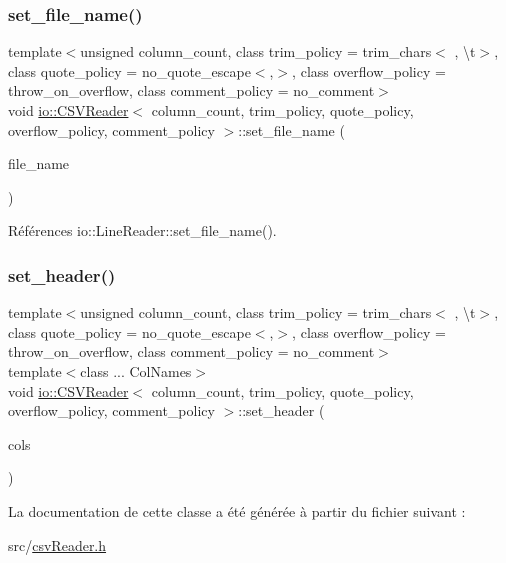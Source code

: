 \subsubsection{\texorpdfstring{set\+\_\+file\+\_\+name()}{set\_file\_name()}\hspace{0.1cm}{\footnotesize\ttfamily [2/2]}}
{\footnotesize\ttfamily template$<$unsigned column\+\_\+count, class trim\+\_\+policy  = trim\+\_\+chars$<$\textquotesingle{} \textquotesingle{}, \textquotesingle{}\textbackslash{}t\textquotesingle{}$>$, class quote\+\_\+policy  = no\+\_\+quote\+\_\+escape$<$\textquotesingle{},\textquotesingle{}$>$, class overflow\+\_\+policy  = throw\+\_\+on\+\_\+overflow, class comment\+\_\+policy  = no\+\_\+comment$>$ \\
void \hyperlink{classio_1_1CSVReader}{io\+::\+C\+S\+V\+Reader}$<$ column\+\_\+count, trim\+\_\+policy, quote\+\_\+policy, overflow\+\_\+policy, comment\+\_\+policy $>$\+::set\+\_\+file\+\_\+name (\begin{DoxyParamCaption}\item[{const char $\ast$}]{file\+\_\+name }\end{DoxyParamCaption})\hspace{0.3cm}{\ttfamily [inline]}}



Références io\+::\+Line\+Reader\+::set\+\_\+file\+\_\+name().

\mbox{\label{classio_1_1CSVReader_ab68eedff1bd59a49fa4ddb160dff94e0}} 
\subsubsection{\texorpdfstring{set\+\_\+header()}{set\_header()}}
{\footnotesize\ttfamily template$<$unsigned column\+\_\+count, class trim\+\_\+policy  = trim\+\_\+chars$<$\textquotesingle{} \textquotesingle{}, \textquotesingle{}\textbackslash{}t\textquotesingle{}$>$, class quote\+\_\+policy  = no\+\_\+quote\+\_\+escape$<$\textquotesingle{},\textquotesingle{}$>$, class overflow\+\_\+policy  = throw\+\_\+on\+\_\+overflow, class comment\+\_\+policy  = no\+\_\+comment$>$ \\
template$<$class ... Col\+Names$>$ \\
void \hyperlink{classio_1_1CSVReader}{io\+::\+C\+S\+V\+Reader}$<$ column\+\_\+count, trim\+\_\+policy, quote\+\_\+policy, overflow\+\_\+policy, comment\+\_\+policy $>$\+::set\+\_\+header (\begin{DoxyParamCaption}\item[{Col\+Names...}]{cols }\end{DoxyParamCaption})\hspace{0.3cm}{\ttfamily [inline]}}



La documentation de cette classe a été générée à partir du fichier suivant \+:\begin{DoxyCompactItemize}
\item 
src/\hyperlink{csvReader_8h}{csv\+Reader.\+h}\end{DoxyCompactItemize}
